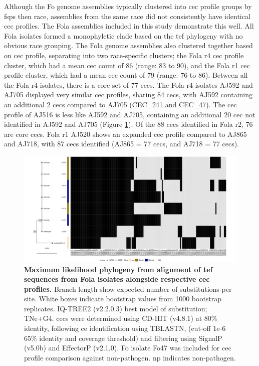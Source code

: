 Although the \ac{Fo} genome assemblies typically clustered into \ac{cec} profile groups by \acp{fsp} then race, assemblies from the same race did not consistently have identical \ac{cec} profiles. The \ac{Fola} assemblies included in this study demonstrate this well. All \ac{Fola} isolates formed a monophyletic clade based on the \ac{tef} phylogeny with no obvious race grouping. The \ac{Fola} genome assemblies also clustered together based on \ac{cec} profile, separating into two race-specific clusters; the \ac{Fola} \ac{r4} \ac{cec} profile cluster, which had a mean \ac{cec} count of 86  (range: 83 to 90), and the \ac{Fola} \ac{r1} \ac{cec} profile cluster, which had a mean \ac{cec} count of 79 (range: 76 to 86). Between all the \ac{Fola} \ac{r4} isolates, there is a core set of 77 \acp{cec}. The \ac{Fola} \ac{r4} isolates AJ592 and AJ705 displayed very similar \ac{cec} profiles, sharing 84 \acp{cec}, with AJ592 containing an additional 2 \acp{cec} compared to AJ705 (CEC\_241 and CEC\_47). The \ac{cec} profile of AJ516 is less like AJ592 and AJ705, containing an additional 20 \ac{cec} not identified in AJ592 and AJ705 (Figure \ref{fig:MaeiHeatmap-lettuce}). Of the 88 \acp{cec} identified in \ac{Fola} \ac{r2}, 76 are core \acp{cec}. \ac{Fola} \ac{r1} AJ520 shows an expanded \ac{cec} profile compared to AJ865 and AJ718, with 87 \acp{cec} identified (AJ865 = 77 \acp{cec}, and AJ718 = 77 \acp{cec}).

\begin{figure}
    \centering
    \includegraphics[width=\textwidth]{Figures/HeatmapAndPhylo_LactucaeOnly.png}
    \captionsetup{width=24cm}
    \caption[Maximum likelihood phylogeny from alignment of \Acl{tef} sequences from \acl{Fola} and \acl{Foci} isolates alongside respective \acl{cec} profiles.]{\textbf{Maximum likelihood phylogeny from alignment of \Acf{tef} sequences from \acf{Fola} isolates alongside respective \acf{cec} profiles.}  Branch length show expected number of substitutions per site. White boxes indicate bootstrap values from 1000 bootstrap replicates. IQ-TREE2 (v2.2.0.3) best model of substitution; TNe+G4. \Acp{cec} were determined using CD-HIT (v4.8.1) at 80\% identity, following \ac{ce} identification using TBLASTN, (cut-off 1e-6 65\% identity and coverage threshold) and filtering using SignalP (v5.0b) and EffectorP (v2.1.0). \ac{Fo} isolate Fo47 was included for \ac{cec} profile comparison against non-pathogen. np indicates non-pathogen.}
    \label{fig:MaeiHeatmap-lettuce}
\end{figure}

